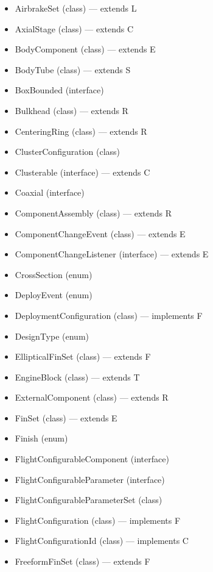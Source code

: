 \documentclass{amsdtx}
\begin{document}
\begin{itemize}
\begin{itemize}
    \begin{itemize}
    
    \item
      AirbrakeSet (class) --- extends L
    \item
      AxialStage (class) --- extends C
    \item
      BodyComponent (class) --- extends E
    \item
      BodyTube (class) --- extends S
    \item
      BoxBounded (interface)
    \item
      Bulkhead (class) --- extends R
    \item
      CenteringRing (class) --- extends R
    \item
      ClusterConfiguration (class)
    \item
      Clusterable (interface) --- extends C
    \item
      Coaxial (interface)
    \item
      ComponentAssembly (class) --- extends R
    \item
      ComponentChangeEvent (class) --- extends E
    \item
      ComponentChangeListener (interface) --- extends E
    \item
      CrossSection (enum)
    \item
      DeployEvent (enum)
    \item
      DeploymentConfiguration (class) --- implements F
    \item
      DesignType (enum)
    \item
      EllipticalFinSet (class) --- extends F
    \item
      EngineBlock (class) --- extends T
    \item
      ExternalComponent (class) --- extends R
    \item
      FinSet (class) --- extends E
    \item
      Finish (enum)
    \item
      FlightConfigurableComponent (interface)
    \item
      FlightConfigurableParameter (interface)
    \item
      FlightConfigurableParameterSet (class)
    \item
      FlightConfiguration (class) --- implements F
    \item
      FlightConfigurationId (class) --- implements C
    \item
      FreeformFinSet (class) --- extends F

\end{itemize}
\end{itemize}
\end{itemize}
\end{document}
